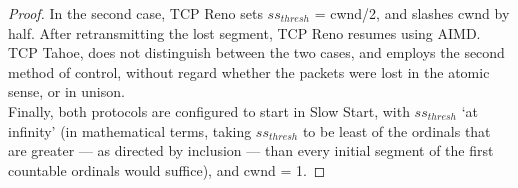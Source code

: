 \documentclass[../../main.tex]{subfiles}
\begin{document}
\begin{proof}
In the second case, TCP Reno sets ${ss}_{thresh}$ = cwnd/2, and slashes cwnd by half. After retransmitting the lost segment, TCP Reno resumes using AIMD.\\

TCP Tahoe, does not distinguish between the two cases, and employs the second method of control, without regard whether the packets were lost in the atomic sense, or in unison.\\

Finally, both protocols are configured to start in Slow Start, with ${ss}_{thresh}$ ‘at infinity’ (in mathematical terms, taking ${ss}_{thresh}$ to be least of the ordinals that are greater — as directed by inclusion — than every initial segment of the first countable ordinals would suffice), and cwnd = 1.
\end{proof}
\end{document}
